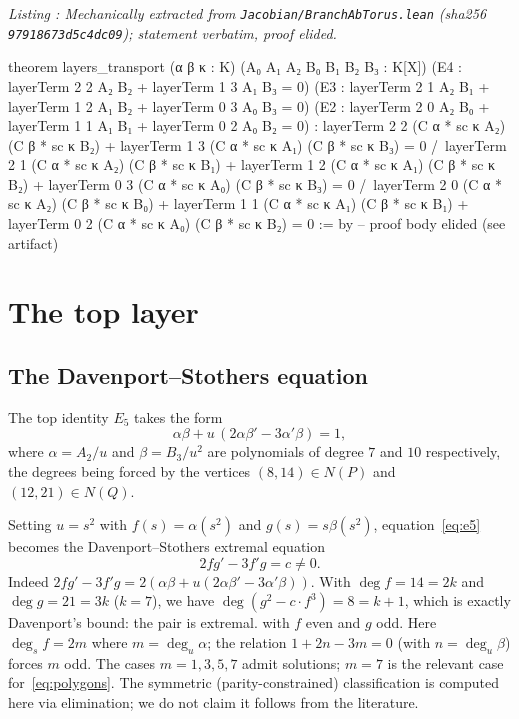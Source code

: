 \documentclass[a4paper,11pt]{article}
\newcounter{leanlisting}
\newenvironment{leanlisting}[2]{%
  \refstepcounter{leanlisting}\label{#2}%
  \begin{center}\textit{\small Listing \theleanlisting: #1}\end{center}%
  \Verbatim[breaklines=true,breakanywhere=true,fontsize=\footnotesize,frame=single,framesep=4pt,rulecolor=\color{gray!50},fillcolor=\color{gray!5}]%
}{%
  \endVerbatim%
}
\theoremstyle{plain}
\theoremstyle{definition}
\theoremstyle{remark}
\begin{document}
\begin{leanlisting}{Mechanically extracted from \texttt{Jacobian/BranchAbTorus.lean} (sha256 \texttt{97918673d5c4dc09}); statement verbatim, proof elided.}{lst:torus}
theorem layers_transport (α β κ : K) (A₀ A₁ A₂ B₀ B₁ B₂ B₃ : K[X])
    (E4 : layerTerm 2 2 A₂ B₂ + layerTerm 1 3 A₁ B₃ = 0)
    (E3 : layerTerm 2 1 A₂ B₁ + layerTerm 1 2 A₁ B₂ + layerTerm 0 3 A₀ B₃ = 0)
    (E2 : layerTerm 2 0 A₂ B₀ + layerTerm 1 1 A₁ B₁ + layerTerm 0 2 A₀ B₂ = 0) :
    layerTerm 2 2 (C α * sc κ A₂) (C β * sc κ B₂) + layerTerm 1 3 (C α * sc κ A₁) (C β * sc κ B₃) = 0 /\
    layerTerm 2 1 (C α * sc κ A₂) (C β * sc κ B₁) + layerTerm 1 2 (C α * sc κ A₁) (C β * sc κ B₂) +
      layerTerm 0 3 (C α * sc κ A₀) (C β * sc κ B₃) = 0 /\
    layerTerm 2 0 (C α * sc κ A₂) (C β * sc κ B₀) + layerTerm 1 1 (C α * sc κ A₁) (C β * sc κ B₁) +
      layerTerm 0 2 (C α * sc κ A₀) (C β * sc κ B₂) = 0 := by
  -- proof body elided (see artifact)
\end{leanlisting}

\section{The top layer}\label{sec:top}

\subsection{The Davenport--Stothers equation}

The top identity $E_5$ takes the form
\begin{equation}\label{eq:e5}
\alpha\beta+u\,(2\alpha\beta'-3\alpha'\beta)=1,
\end{equation}
where $\alpha=A_2/u$ and $\beta=B_3/u^2$ are polynomials of degree $7$ and $10$ respectively, the degrees being forced by the vertices $(8,14)\in N(P)$ and $(12,21)\in N(Q)$.

Setting $u=s^2$ with $f(s)=\alpha(s^2)$ and $g(s)=s\beta(s^2)$, equation~\eqref{eq:e5} becomes the Davenport--Stothers extremal equation~\cite{Stothers,Davenport}
\begin{equation}
2fg'-3f'g=c\neq0.
\end{equation}
Indeed $2fg'-3f'g=2(\alpha\beta+u(2\alpha\beta'-3\alpha'\beta))$. With $\deg f=14=2k$ and $\deg g=21=3k$ ($k=7$), we have $\deg(g^2-c\cdot f^3)=8=k+1$, which is exactly Davenport's bound: the pair is extremal.
with $f$ even and $g$ odd. Here $\deg_s f = 2m$ where $m=\deg_u\alpha$; the relation $1+2n-3m=0$ (with $n=\deg_u\beta$) forces $m$ odd. The cases $m=1,3,5,7$ admit solutions; $m=7$ is the relevant case for~\eqref{eq:polygons}. The symmetric (parity-constrained) classification is computed here via elimination; we do not claim it follows from the literature.
\end{document}
